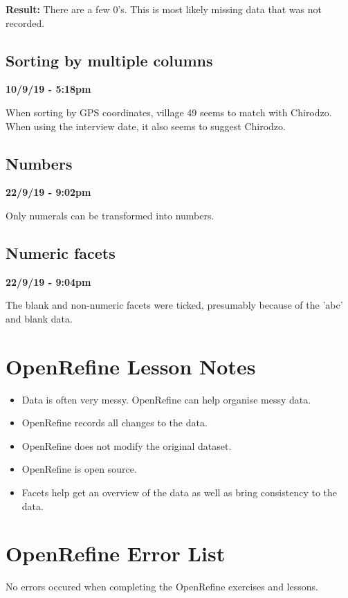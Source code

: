 \documentclass{article}
\begin{document}
\textbf{Result:} There are a few 0's. This is most likely missing data that was not recorded.

\subsection{Sorting by multiple columns}

\textbf{10/9/19 - 5:18pm}

When sorting by GPS coordinates, village 49 seems to match with Chirodzo. When using the interview date, it also seems to suggest Chirodzo.

\subsection{Numbers}

\textbf{22/9/19 - 9:02pm}

Only numerals can be transformed into numbers.

\subsection{Numeric facets}

\textbf{22/9/19 - 9:04pm}

The blank and non-numeric facets were ticked, presumably because of the 'abc' and blank data.

\newpage
\section{OpenRefine Lesson Notes}

\begin{itemize}
    \item Data is often very messy. OpenRefine can help organise messy data.
    \item OpenRefine records all changes to the data.
    \item OpenRefine does not modify the original dataset.
    \item OpenRefine is open source.
    \item Facets help get an overview of the data as well as bring consistency to the data.
\end{itemize}

\section{OpenRefine Error List}

No errors occured when completing the OpenRefine exercises and lessons.
\end{document}
